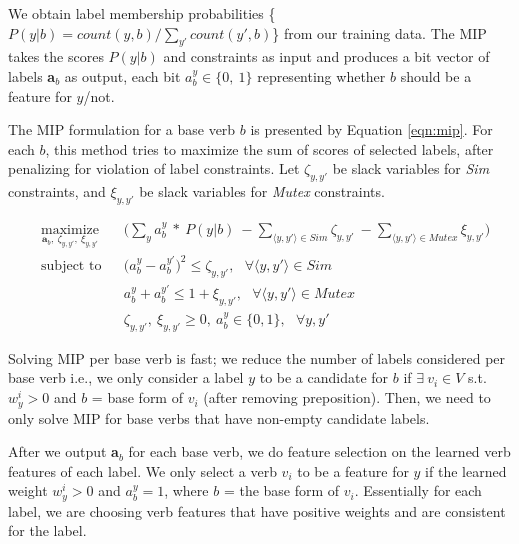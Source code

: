 We obtain label membership probabilities \{$P(y | b) = count(y, b) / \sum_{y'} count(y', b) $\} from our training data. The MIP takes the scores $P(y | b)$ and constraints as input and produces a bit vector of labels \textbf{a}$_{b}$ as output, each bit  $a_{b}^{y} \in \{0,\ 1\}$ representing whether $b$ should be a feature for $y$/not.

The MIP formulation for a base verb $b$ is presented by Equation \ref{eqn:mip}. For each $b$, this method tries to maximize the sum of scores of selected labels, after penalizing for violation of label constraints. Let $\zeta_{y, y'}$ be slack variables for \textit{Sim} constraints, and $\xi_{y, y'}$ be slack variables for \textit{Mutex} constraints. 

\scriptsize
\begin{equation}
\begin{aligned}
& \operatorname*{maximize}_{\textbf{a}_b,\ \zeta_{y, y'},\ \xi_{y, y'}}
& & \bigg( \sum_{y} a_{b}^{y}\ *\ P(y | b)\ - \sum_{\langle y, y'\rangle \in Sim} \zeta_{y, y'}\ - \sum_{\langle y, y'\rangle \in Mutex} \xi_{y, y'}\bigg) \\ 
& \text{subject to} & & \big(a_{b}^{y} - a_{b}^{y'}\big)^2 \leq \zeta_{y, y'},\ \ \ \forall \langle y, y'\rangle \in Sim \\
& & & a_{b}^{y} + a_{b}^{y'} \leq 1 + \xi_{y, y'},\ \ \ \forall \langle y, y'\rangle \in Mutex \\
& & & \zeta_{y, y'},\ \xi_{y, y'} \geq 0,\ a_{b}^{y} \in \{0, 1\},\ \ \ \forall y, y'
\label{eqn:mip}
\end{aligned}
\end{equation}
\normalsize

Solving MIP per base verb is fast; we reduce the number of labels considered per base verb i.e., we only consider a label $y$ to be a candidate for $b$ if $\exists\ v_i \in V$ s.t. $w_y^i > 0$ and $b$ = base form of $v_i$ (after removing preposition). Then, we need to only solve MIP for base verbs that have non-empty candidate labels. 

After we output \textbf{a}$_b$ for each base verb, we do feature selection on the learned verb features of each label. We only select a verb $v_i$ to be a feature for $y$ if the learned weight $w_y^i > 0$ and $a_b^{y} = 1$, where $b$ = the base form of $v_i$. Essentially for each label, we are choosing verb features that have positive weights and are consistent for the label.